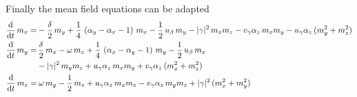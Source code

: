 \documentclass{article}
\begin{document}
Finally the mean field equations can be adapted
\begin{align*}
   \frac{\text{d}}{\text{d}t}\, {m_x}=&-\frac{\delta}{2}\, {m_y}+\frac{1}{4}\,\left(\alpha_y-\alpha_x-1 \right)\, {m_x} -\frac{1}{2}\,u_\beta\, {m_y} -|\gamma|^2\,m_xm_z- v_\gamma\alpha_z\,m_xm_y- u_\gamma\alpha_z\,(m_y^2+m_z^2) \\
\frac{\text{d}}{\text{d}t}\, {m_y}=&\,\frac{\delta}{2}\, {m_x}-\omega\, {m_z}  +\frac{1}{4}\,\left(\alpha_x-\alpha_y-1 \right)\, {m_y}-\frac{1}{2}\,u_\beta\, {m_x} \\
&-|\gamma|^2\,m_ym_z+ u_\gamma\alpha_z\,m_xm_y+ v_\gamma\alpha_z\,(m_x^2+m_z^2) \\
\frac{\text{d}}{\text{d}t}\, {m_z}=&\:\omega\, {m_y}-\frac{1}{2}\, {m_z} + u_\gamma\alpha_z\,m_xm_z - v_\gamma\alpha_z\,m_ym_z+ |\gamma|^2\,(m_x^2+m_y^2)
\end{align*}
\end{document}

